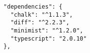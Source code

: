 \begin{verbatim}
  "dependencies": {
    "chalk": "^1.1.3",
    "diff": "^2.2.3",
    "minimist": "^1.2.0",
    "typescript": "2.0.10"
  },
\end{verbatim}

